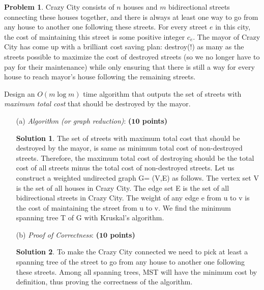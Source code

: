 \documentclass{article}
\theoremstyle{definition}
\newtheorem{problem}{Problem}
\newtheorem*{solution*}{Solution}
\newenvironment{solution}{\begin{solution*}}{{} \end{solution*}}
\newcommand{\grade}[1]{\hfill{\textbf{($\mathbf{#1}$ points)}}}
\begin{document}
\begin{problem}\label{mst}
	Crazy City consists of $n$ houses and $m$ bidirectional streets connecting these houses together, and there is always at least one way to go from any house to another one following these streets. 
	For every street $e$ in this city, the cost of maintaining this street is some positive integer $c_e$. 
	The mayor of Crazy City has come up with a brilliant cost saving plan: destroy(!) as many as the streets possible to maximize the cost of destroyed streets (so we no longer have to pay for their maintenance) while only ensuring that there is still a way for every house to reach mayor's house following the remaining streets. 
	
	Design an $O(m\log{m})$ time algorithm that outputs the set of streets with \emph{maximum total cost} that should be destroyed by the mayor. 

\begin{enumerate}
	\item[(a)] \emph{Algorithm (or graph reduction)}: \grade{10} 
	
	
\begin{solution}

	The set of streets with maximum total cost that should be destroyed by the mayor, is same as minimum total cost of non-destroyed streets. Therefore, the maximum total cost of destroying should be the total cost of all streets minus the total cost of non-destroyed streets. Let us construct a weighted undirected graph G= (V,E) as follows. The vertex set V is the set of all houses in Crazy City. The edge set E is the set of all bidirectional streets in Crazy City. The weight of any edge e from u to v is the cost of maintaining the street from u to v. We find the minimum spanning tree T of G with Kruskal’s algorithm. \\

\end{solution}

	\newpage
	\item[(b)] \emph{Proof of Correctness}: \grade{10} 
	
\begin{solution}

		To make the Crazy City connected we need to pick at least a spanning tree of the street to go from any house to another one following these streets. Among all spanning trees, MST will have the minimum cost by definition, thus proving the correctness of the algorithm. \\


\end{solution}
\end{enumerate}
\end{problem}
\end{document}
